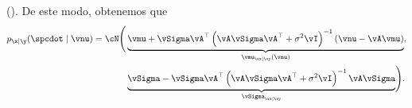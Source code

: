 \documentclass[../../book-main_es.tex]{subfiles}
\begin{document}
\begin{example}
    ().
    De este modo, obtenemos que
    \begin{equation}
        \begin{split}
            p_{\x \mid \y}(\spcdot \mid \vnu) = \cN\Biggl(
                &\underbrace{%
                    \vmu + \vSigma\vA^\top \left(\vA\vSigma\vA^\top +
                    \sigma^2 \vI\right)^{-1}
                (\vnu - \vA\vmu)}_{\vmu_{\vx \mid \vy}(\vnu)}, \\
                &\underbrace{%
                    \vSigma - \vSigma \vA^\top
                    \left(\vA\vSigma\vA^\top + \sigma^2
                \vI\right)^{-1} \vA \vSigma}_{\vSigma_{\vx\mid \vy}}
            \Biggr).
        \end{split}
    \end{equation}


\end{example}
\end{document}
